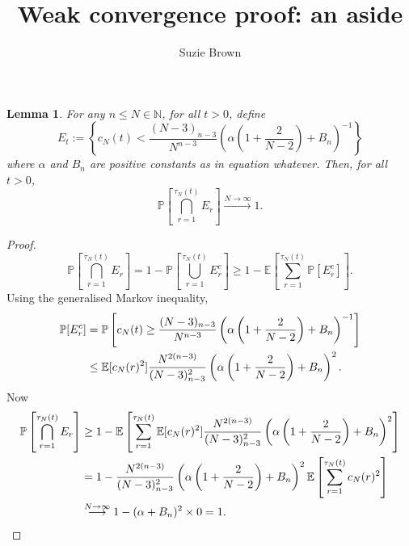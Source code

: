 \documentclass{article}
\title{Weak convergence proof: an aside}
\author{Suzie Brown}
\newtheorem{lemma}{Lemma}
\newcommand{\Prob}{\mathbb{P}}
\newcommand{\E}{\mathbb{E}}
\newcommand{\1}[1]{\mathbb{I}_{#1}}
\begin{document}
\maketitle
\thispagestyle{fancy}

\begin{lemma}
For any $n \leq N \in \mathbb{N}$, for all $t>0$, define 
\begin{equation}
E_t := \left\{ c_N(t) < \frac{(N-3)_{n-3}}{N^{n-3}} \left( \alpha \left(1 + \frac{2}{N-2} \right) + B_n \right)^{-1} \right\} 
\end{equation}
where $\alpha$ and $B_n$ are positive constants as in equation whatever.
Then, for all $t>0$,
\begin{equation}
\Prob \left[  \bigcap_{r=1}^{\tau_N(t)} E_r \right] \overset{N\to\infty}{\longrightarrow} 1 .
\end{equation}
\end{lemma}

\begin{proof}
\begin{equation}
\Prob \left[  \bigcap_{r=1}^{\tau_N(t)} E_r \right]
= 1 - \Prob \left[  \bigcup_{r=1}^{\tau_N(t)} E_r^c \right]
\geq 1 - \E \left[ \sum_{r=1}^{\tau_N(t)} \Prob [E_r^c] \right] .
\end{equation}
Using the generalised Markov inequality,
\begin{align}
\Prob [E_r^c] &= \Prob \left[ c_N(t) \geq \frac{(N-3)_{n-3}}{N^{n-3}} \left( \alpha \left(1 + \frac{2}{N-2} \right) + B_n \right)^{-1} \right] \notag\\
&\leq \E[c_N(r)^2] \frac{N^{2(n-3)}}{(N-3)_{n-3}^2} \left( \alpha \left(1 + \frac{2}{N-2} \right) + B_n \right)^2 .
\end{align}
Now
\begin{align}
\Prob \left[  \bigcap_{r=1}^{\tau_N(t)} E_r \right]
&\geq 1 - \E \left[  \sum_{r=1}^{\tau_N(t)} \E[c_N(r)^2] \frac{N^{2(n-3)}}{(N-3)_{n-3}^2} \left( \alpha \left(1 + \frac{2}{N-2} \right) + B_n \right)^2 \right] \notag\\
&= 1 - \frac{N^{2(n-3)}}{(N-3)_{n-3}^2} \left( \alpha \left(1 + \frac{2}{N-2} \right) + B_n \right)^2 
\E \left[ \sum_{r=1}^{\tau_N(t)} c_N(r)^2 \right] \notag\\
&\overset{N\to\infty}{\longrightarrow} 1 - (\alpha + B_n)^2 \times 0 = 1 .
\end{align}

\end{proof}
\end{document}
